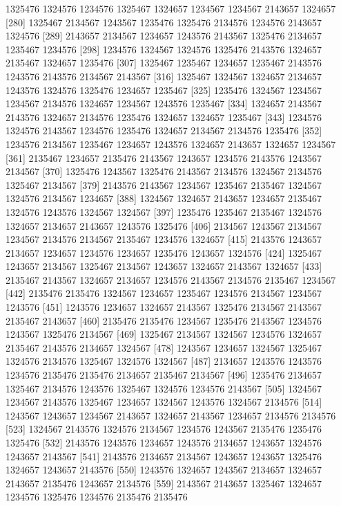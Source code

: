 \documentclass{scrartcl}
\begin{document}
\begin{Schunk}
\begin{Soutput}
 [271] 1325476 1324576 1234576 1325467 1324657 1234567 1234567 2143657 1324657
 [280] 1325467 2134567 1243567 1235476 1325476 2134576 1234576 2143657 1324576
 [289] 2143657 2134567 1234657 1243576 2143567 1325476 2134657 1235467 1234576
 [298] 1234576 1324567 1324576 1325476 2143576 1324657 2135467 1324657 1235476
 [307] 1325467 1235467 1234657 1235467 2143576 1243576 2143576 2134567 2143567
 [316] 1325467 1324567 1324657 2134657 1243576 1324576 1325476 1234657 1235467
 [325] 1235476 1324567 1234567 1234567 2134576 1324657 1234567 1243576 1235467
 [334] 1324657 2143567 2143576 1324657 2134576 1235476 1324657 1324657 1235467
 [343] 1234576 1324576 2143567 1234576 1235476 1324657 2134567 2134576 1235476
 [352] 1234576 2134567 1235467 1234657 1243576 1324657 2143657 1324657 1234567
 [361] 2135467 1234657 2135476 2143567 1243657 1234576 2143576 1243567 2134567
 [370] 1325476 1243567 1325476 2143567 2134576 1324567 2134576 1325467 2134567
 [379] 2143576 2143567 1234567 1235467 2135467 1324567 1324576 2134567 1234657
 [388] 1324567 1324657 2143657 1234657 2135467 1324576 1243576 1324567 1324567
 [397] 1235476 1235467 2135467 1324576 1324657 2134657 2143657 1243576 1325476
 [406] 2134567 1243567 2134567 1234567 2134576 2134567 2135467 1234576 1324657
 [415] 2143576 1243657 2134657 1234657 1234576 1234657 1235476 1243657 1324576
 [424] 1325467 1243657 2134567 1325467 2134567 1243657 1324657 2143567 1324657
 [433] 2135467 2143567 1324657 2134657 1234576 2143567 2134576 2135467 1234567
 [442] 2135476 2135476 1324567 1234657 1235467 1234576 2134567 1234567 1243576
 [451] 1243576 1234657 1324657 2143567 1325476 2134567 2143567 2135467 2143657
 [460] 2135476 2135476 1234567 1235476 2143567 1234576 1243567 1325476 2134567
 [469] 1325467 2134567 1324567 1234576 1324657 2135467 2143576 2134657 1324567
 [478] 1243567 1234657 1324567 1325467 1324576 2134576 1325467 1324576 1324567
 [487] 2134657 1243576 1243576 1234576 2135476 2135476 2134657 2135467 2134567
 [496] 1235476 2134657 1325467 2134576 1243576 1325467 1324576 1234576 2143567
 [505] 1324567 1234567 2143576 1325467 1234657 1324567 1243576 1324567 2134576
 [514] 1243567 1243657 1234567 2143657 1324657 2143567 1234657 2134576 2134576
 [523] 1324567 2143576 1324576 2134567 1234576 1243567 2135476 1235476 1325476
 [532] 2143576 1243576 1234657 1243576 2134657 1243657 1324576 1243657 2143567
 [541] 2143576 2134657 2134567 1243657 1243657 1325476 1324657 1243657 2143576
 [550] 1243576 1324657 1243567 2134657 1324657 2143657 2135476 1243657 2134576
 [559] 2143567 2143657 1325467 1324657 1234576 1325476 1234576 2135476 2135476

\end{Soutput}
\end{Schunk}
\end{document}

